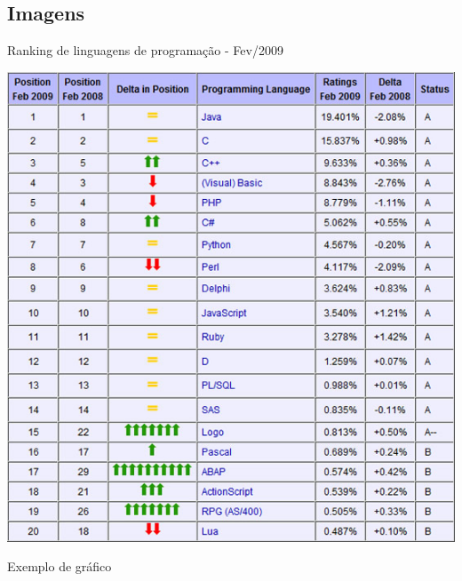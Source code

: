 \lipsum[1-1]


\subsection{Imagens}

\begin{quadro}[htb]
	\caption{Ranking de linguagens de programação - Fev/2009}
	\label{fig:ranking}
 	\includegraphics[width=\textwidth]{figuras/ranking}
\end{quadro}

\begin{grafico}[htb]
	\caption{Exemplo de gráfico}
	\label{graf:grafico2}
\end{grafico}

